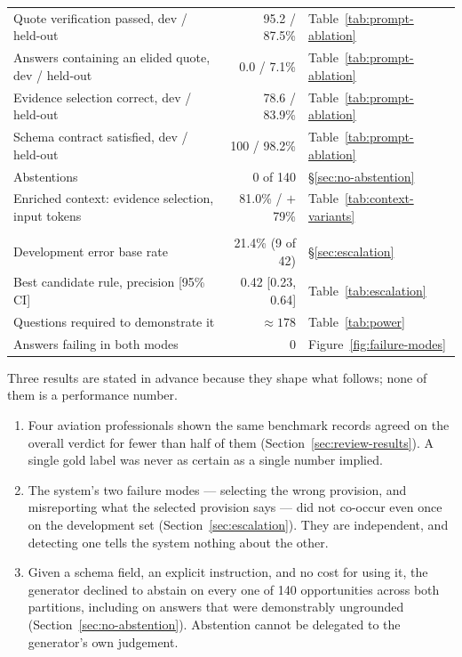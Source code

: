 \begin{table}[htbp]
\begin{tabularx}{\textwidth}{@{}Xrl@{}}
    Quote verification passed, dev / held-out & 95.2 / 87.5\% & Table~\ref{tab:prompt-ablation} \\
    Answers containing an elided quote, dev / held-out & 0.0 / 7.1\% & Table~\ref{tab:prompt-ablation} \\
    Evidence selection correct, dev / held-out & 78.6 / 83.9\% & Table~\ref{tab:prompt-ablation} \\
    Schema contract satisfied, dev / held-out & 100 / 98.2\% & Table~\ref{tab:prompt-ablation} \\
    Abstentions & 0 of 140 & \S\ref{sec:no-abstention} \\
    Enriched context: evidence selection, input tokens & 81.0\% / $+$79\% & Table~\ref{tab:context-variants} \\
    \addlinespace
    \multicolumn{3}{@{}l}{\textit{Escalation}} \\
    Development error base rate & 21.4\% (9 of 42) & \S\ref{sec:escalation} \\
    Best candidate rule, precision [95\% CI] & 0.42 [0.23, 0.64] & Table~\ref{tab:escalation} \\
    Questions required to demonstrate it & $\approx 178$ & Table~\ref{tab:power} \\
    Answers failing in both modes & 0 & Figure~\ref{fig:failure-modes} \\
    \bottomrule
  \end{tabularx}
\end{table}

Three results are stated in advance because they shape what follows; none of
them is a performance number.

\begin{enumerate}
  \item Four aviation professionals shown the same benchmark records agreed on
    the overall verdict for fewer than half of them
    (Section~\ref{sec:review-results}). A single gold label was never as certain
    as a single number implied.
  \item The system's two failure modes --- selecting the wrong provision, and
    misreporting what the selected provision says --- did not co-occur even once
    on the development set (Section~\ref{sec:escalation}). They are independent,
    and detecting one tells the system nothing about the other.
  \item Given a schema field, an explicit instruction, and no cost for using it,
    the generator declined to abstain on every one of 140 opportunities across
    both partitions, including
    on answers that were demonstrably ungrounded
    (Section~\ref{sec:no-abstention}). Abstention cannot be delegated to the
    generator's own judgement.
\end{enumerate}

